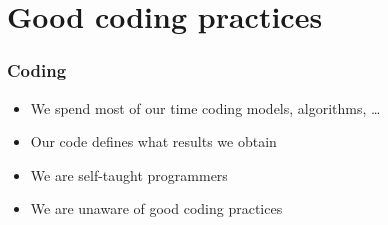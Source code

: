 \documentclass[screen, aspectratio=43]{beamer}
\begin{document}
\section{Good coding practices}

\begin{frame}
  \frametitle{Coding}
  \begin{itemize}
  \item We spend most of our time coding models, algorithms, \ldots
  \item Our code defines what results we obtain
  \item We are self-taught programmers
  \item We are unaware of good coding practices
  \end{itemize}
\end{frame}
\end{document}
